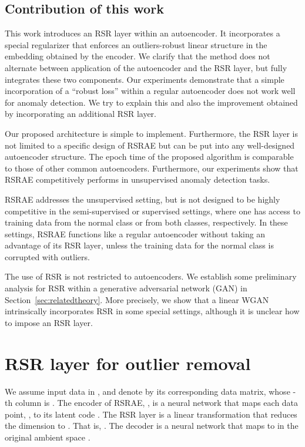 \documentclass{article} \usepackage{iclr2020_conference,times}
\def\Secref#1{Section~\ref{#1}}
\begin{document}
\subsection{Contribution of this work}
\label{subsec:contribution}
This work introduces an RSR layer within an autoencoder. 
It incorporates a special regularizer that enforces an outliers-robust linear structure in the embedding obtained by the encoder. 
We clarify that the method does not alternate between application of the autoencoder and the RSR layer, but fully integrates these two components. Our experiments demonstrate that a simple incorporation of a ``robust loss'' within a regular autoencoder does not work well for anomaly detection. We try to explain this and also the improvement obtained by incorporating an additional RSR layer.


Our proposed architecture is simple to implement. Furthermore, the RSR layer is not limited to a specific design of RSRAE but can be put into any well-designed autoencoder structure. 
The epoch time of the proposed algorithm is comparable to those of other common autoencoders. 
Furthermore, our experiments show that RSRAE competitively performs in unsupervised anomaly detection tasks.

{RSRAE addresses the unsupervised setting, but is not designed to be highly competitive in the semi-supervised or supervised settings, where one has access to training data from the normal class or from both classes, respectively. In these settings, RSRAE functions like a regular autoencoder without taking an advantage of its RSR layer, unless the training data for the normal class is  corrupted with outliers.}



The use of RSR is not restricted to autoencoders. 
We establish some preliminary analysis for RSR within a generative adversarial network (GAN) \citep{goodfellow2014generative, arjovsky2017wasserstein} in \Secref{sec:relatedtheory}.
More precisely, we show that a linear WGAN intrinsically incorporates RSR in some special settings, although it is unclear how to impose 
an RSR layer. 

\section{RSR layer for outlier removal}
\label{sec:alg_describe}
We assume input data  in , and denote by  its corresponding data matrix, whose -th column is . The encoder of RSRAE, , is a neural network that maps each data point, , to its latent code . The RSR layer is a linear transformation  that reduces the dimension to . That is, . The decoder  is a neural network that maps  to  in the original ambient space .
\end{document}
